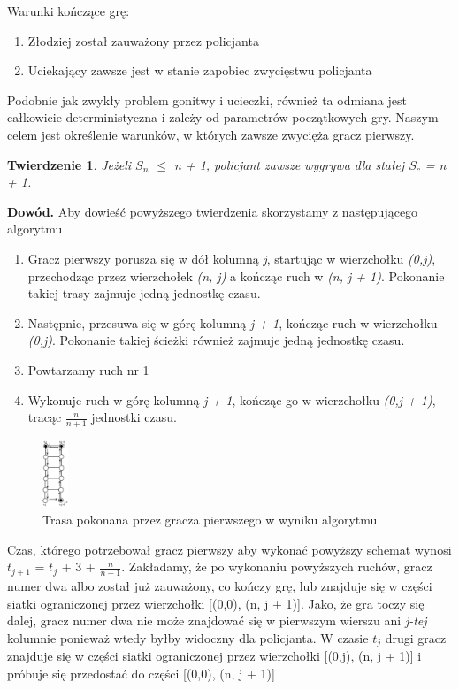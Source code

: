 \documentclass[brudnopis]{xmgr}
\newtheorem{Twierdzenie}{Twierdzenie}
\begin{document}
Warunki kończące grę:
\begin{enumerate}
  \item Złodziej został zauważony przez policjanta
  \item Uciekający zawsze jest w stanie zapobiec zwycięstwu policjanta
\end{enumerate}

Podobnie jak zwykły problem gonitwy i ucieczki, również ta odmiana jest całkowicie deterministyczna i zależy od parametrów początkowych gry. Naszym celem jest określenie warunków, w których zawsze zwycięża gracz pierwszy. 

\begin{Twierdzenie}
	Jeżeli $S_n$ $\le$ n + 1, policjant zawsze wygrywa dla stałej $S_c$ = n + 1.
\end{Twierdzenie}
\textbf{Dowód.} Aby dowieść powyższego twierdzenia skorzystamy z następującego algorytmu
\begin{enumerate}
	\item Gracz pierwszy porusza się w dół kolumną \textit{j}, startując w wierzchołku \textit{(0,j)}, przechodząc przez wierzchołek \textit{(n, j)} a kończąc ruch w \textit{(n, j + 1)}. Pokonanie takiej trasy zajmuje jedną jednostkę czasu.
	\item Następnie, przesuwa się w górę kolumną \textit{j + 1}, kończąc ruch w wierzchołku \textit{(0,j)}. Pokonanie takiej ścieżki również zajmuje jedną jednostkę czasu.
	\item Powtarzamy ruch nr 1
	\item Wykonuje ruch w górę kolumną \textit{j + 1}, kończąc go w wierzchołku \textit{(0,j + 1)}, tracąc $\frac{n}{n+1}$ jednostki czasu.
\end{enumerate}
\begin{figure}[ht!]
  \centering
  \includegraphics[height=2cm]{rysunki/schemat_ruchu.png}
  \caption{Trasa pokonana przez gracza pierwszego w wyniku algorytmu}
\end{figure} 

Czas, którego potrzebował gracz pierwszy aby wykonać powyższy schemat wynosi $t_{j+1}$ = $t_j$ + 3 + $\frac{n}{n+1}$.
Zakładamy, że po wykonaniu powyższych ruchów, gracz numer dwa albo został już zauważony, co kończy grę, lub znajduje się w części siatki ograniczonej przez wierzchołki [(0,0), (n, j + 1)].
\indent Jako, że gra toczy się dalej, gracz numer dwa nie może znajdować się w pierwszym wierszu ani \textit{j-tej} kolumnie ponieważ wtedy byłby widoczny dla policjanta. W czasie \textit{$t_j$} drugi gracz znajduje się w części siatki ograniczonej przez wierzchołki [(0,j), (n, j + 1)] i próbuje się przedostać do części [(0,0), (n, j + 1)]
\end{document}
